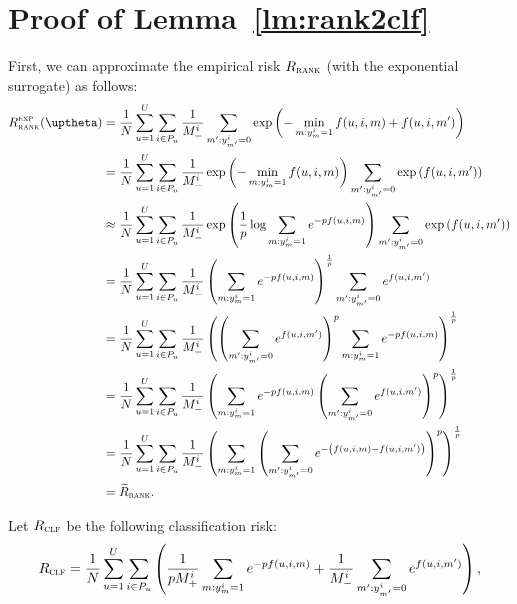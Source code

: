 \section{Proof of Lemma~\ref{lm:rank2clf}}

First, we can approximate the empirical risk $R_\textsc{rank}$ (with the exponential surrogate) as follows:
\begin{equation*}
\begin{aligned}
R_\textsc{rank}^\textsc{exp}(\uptheta)
&= \frac{1}{N} \sum_{u=1}^U \sum_{i \in P_u} \frac{1}{M_-^i} \sum_{m': y_{m'}^i = 0} \exp \left( -\min_{m: y_m^i = 1} f(u, i, m) + f(u, i, m') \right) \\
&= \frac{1}{N} \sum_{u=1}^U \sum_{i \in P_u} \frac{1}{M_-^i} \exp \left( -\min_{m: y_m^i = 1} f(u, i, m) \right) 
   \sum_{m': y_{m'}^i = 0} \exp \left( f(u, i, m') \right) \\
&\approx \frac{1}{N} \sum_{u=1}^U \sum_{i \in P_u} \frac{1}{M_-^i} \exp \left( \frac{1}{p} \log \sum_{m: y_m^i = 1} e^{-p f(u, i, m)} \right)
   \sum_{m': y_{m'}^i = 0} \exp \left( f(u, i, m') \right) \\
&= \frac{1}{N} \sum_{u=1}^U \sum_{i \in P_u} \frac{1}{M_-^i} \left( \sum_{m: y_m^i = 1} e^{-p f(u, i, m)} \right)^\frac{1}{p} 
   \sum_{m': y_{m'}^i = 0} e^{f(u, i, m')} \\
&= \frac{1}{N} \sum_{u=1}^U \sum_{i \in P_u} \frac{1}{M_-^i} \left( \left( \sum_{m': y_{m'}^i = 0} e^{f(u, i, m')} \right)^p 
   \sum_{m: y_m^i = 1} e^{-p f(u, i, m)} \right)^\frac{1}{p} \\
&= \frac{1}{N} \sum_{u=1}^U \sum_{i \in P_u} \frac{1}{M_-^i} \left( 
   \sum_{m: y_m^i = 1} e^{-p f(u, i, m)} \left( \sum_{m': y_{m'}^i = 0} e^{f(u, i, m')} \right)^p \right)^\frac{1}{p} \\
&= \frac{1}{N} \sum_{u=1}^U \sum_{i \in P_u} \frac{1}{M_-^i} \left( 
   \sum_{m: y_m^i = 1} \left( \sum_{m': y_{m'}^i = 0} e^{- \left( f(u, i, m) - f(u, i, m') \right)} \right)^p \right)^\frac{1}{p} \\
&= \widetilde R_\textsc{rank}.
\end{aligned}
\end{equation*}

Let $R_\textsc{clf}$ be the following classification risk:
\begin{equation*}
R_\textsc{clf} 
= \frac{1}{N} \sum_{u=1}^U \sum_{i \in P_u} \left( 
  \frac{1}{p M_+^i} \sum_{m: y_m^i = 1} e^{-p f(u, i, m)} 
  + \frac{1}{M_-^i} \sum_{m': y_{m'}^i = 0} e^{f(u, i, m')} \right),
\end{equation*}

